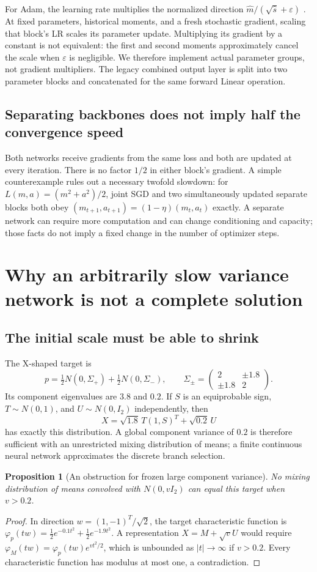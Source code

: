 \documentclass[11pt,a4paper]{article}
\newtheorem{proposition}{Proposition}[section]
\begin{document}
For Adam, the learning rate multiplies the normalized direction
$\widehat m/(\sqrt{\widehat s}+\varepsilon)$ \cite{adam}. At fixed parameters,
historical moments, and a fresh stochastic gradient, scaling that block's LR
scales its parameter update. Multiplying its gradient by a constant is not
equivalent: the first and second moments approximately cancel the scale when
$\varepsilon$ is negligible. We therefore implement actual parameter groups,
not gradient multipliers. The legacy combined output layer is split into two
parameter blocks and concatenated for the same forward Linear operation.

\subsection{Separating backbones does not imply half the convergence speed}
Both networks receive gradients from the same loss and both are updated at
every iteration. There is no factor $1/2$ in either block's gradient. A simple
counterexample rules out a necessary twofold slowdown: for
$L(m,a)=(m^2+a^2)/2$, joint SGD and two simultaneously updated separate
blocks both obey $(m_{t+1},a_{t+1})=(1-\eta)(m_t,a_t)$ exactly. A separate
network can require more computation and can change conditioning and capacity;
those facts do not imply a fixed change in the number of optimizer steps.

\section{Why an arbitrarily slow variance network is not a complete solution}
\subsection{The initial scale must be able to shrink}
The X-shaped target is
\[
 p=\tfrac12N(0,\Sigma_+)+\tfrac12N(0,\Sigma_-),\qquad
 \Sigma_\pm=\begin{pmatrix}2&\pm1.8\\\pm1.8&2\end{pmatrix}.
\]
Its component eigenvalues are $3.8$ and $0.2$. If $S$ is an equiprobable sign,
$T\sim N(0,1)$, and $U\sim N(0,I_2)$ independently, then
\[
 X=\sqrt{1.8}\,T(1,S)^T+\sqrt{0.2}\,U
\]
has exactly this distribution. A global component variance of $0.2$ is
therefore sufficient with an unrestricted mixing distribution of means; a
finite continuous neural network approximates the discrete branch selection.

\begin{proposition}[An obstruction for frozen large component variance]
No mixing distribution of means convolved with $N(0,vI_2)$ can equal this
target when $v>0.2$.
\end{proposition}
\begin{proof}
In direction $w=(1,-1)^T/\sqrt2$, the target characteristic function is
$\varphi_p(tw)=\tfrac12e^{-0.1t^2}+\tfrac12e^{-1.9t^2}$. A representation
$X=M+\sqrt vU$ would require
$\varphi_M(tw)=\varphi_p(tw)e^{vt^2/2}$, which is unbounded as
$|t|\to\infty$ if $v>0.2$. Every characteristic function has modulus at most
one, a contradiction.
\end{proof}
\end{document}
